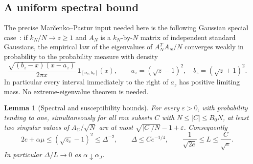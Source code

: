 \documentclass[11pt,a4paper]{article}
\numberwithin{equation}{section}
\newtheorem{lemma}[theorem]{Lemma}
\theoremstyle{definition}
\theoremstyle{remark}
\newcommand{\ind}{\mathbf 1}
\newcommand{\eps}{\varepsilon}
\begin{document}
\subsection{A uniform spectral bound}

The precise Mar\v{c}enko--Pastur input needed here is the following
Gaussian special case~\cite[Theorem~1 and Example~1,
pp.~459--461]{MarcenkoPastur1967}: if \(k_N/N\to z\ge1\)
and \(A_N\) is a \(k_N\)-by-\(N\) matrix of independent standard
Gaussians, the empirical law of the eigenvalues of \(A_N^TA_N/N\)
converges weakly in probability to the probability measure with
density
\[
 \frac{\sqrt{(b_z-x)(x-a_z)}}{2\pi x}\,
 \ind_{[a_z,b_z]}(x),
 \qquad a_z=(\sqrt z-1)^2,\quad b_z=(\sqrt z+1)^2.
\]
In particular every interval immediately to the right of \(a_z\)
has positive limiting mass.  No extreme-eigenvalue theorem is needed.

\begin{lemma}[Spectral and susceptibility bounds]\label{zero:spectral}
For every \(\eps>0\), with probability tending to one, simultaneously
for all row subsets \(C\) with \(N\le|C|\le B_0N\), at least two
singular values of \(A_C/\sqrt N\) are at most
\(\sqrt{|C|/N}-1+\eps\).  Consequently
\begin{equation}\label{zero:susceptibility-bounds}
 2e+\alpha\mu\le(\sqrt{z_c}-1)^2\le\Delta^{-2},
 \qquad
 \Delta\le C e^{-1/4},
 \qquad
 \frac1{\sqrt{2e}}\le L\le\frac C{\sqrt e}.
\end{equation}
In particular \(\Delta/L\to0\) as \(\alpha\downarrow\alpha_J\).
\end{lemma}
\end{document}

